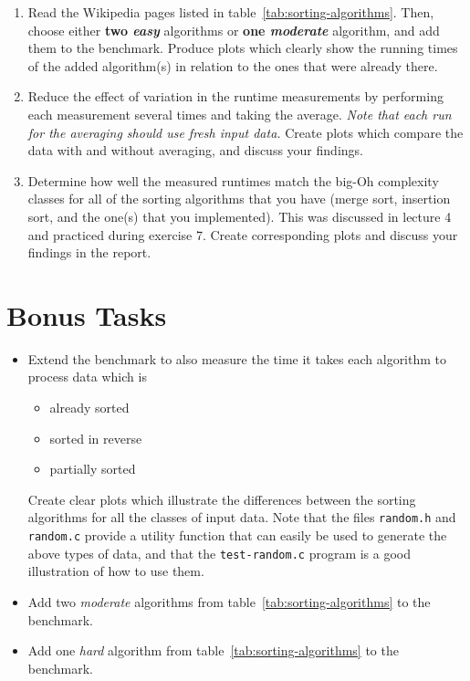 \documentclass[a4paper,10pt]{article}
\begin{document}
\begin{enumerate}

\item
  Read the Wikipedia pages listed in table~\ref{tab:sorting-algorithms}.
  Then, choose either \textbf{two \emph{easy}} algorithms or \textbf{one \emph{moderate}} algorithm, and add them to the benchmark.
  Produce plots which clearly show the running times of the added algorithm(s) in relation to the ones that were already there.

\item
  Reduce the effect of variation in the runtime measurements by performing each measurement several times and taking the average.
  \emph{Note that each run for the averaging should use fresh input data.}
  Create plots which compare the data with and without averaging, and discuss your findings.
  
\item
  Determine how well the measured runtimes match the big-Oh complexity classes for all of the sorting algorithms that you have (merge sort, insertion sort, and the one(s) that you implemented).
  This was discussed in lecture 4 and practiced during exercise 7.
  Create corresponding plots and discuss your findings in the report.
  
\end{enumerate}



\section{Bonus Tasks}

\begin{itemize}

\item
  Extend the benchmark to also measure the time it takes each algorithm to process data which is
  \begin{itemize}
  \item
    already sorted
  \item
    sorted in reverse
  \item
    partially sorted
  \end{itemize}
  Create clear plots which illustrate the differences between the sorting algorithms for all the classes of input data.
  Note that the files \texttt{random.h} and \texttt{random.c} provide a utility function that can easily be used to generate the above types of data, and that the \texttt{test-random.c} program is a good illustration of how to use them.
  
\item
  Add two \emph{moderate} algorithms from table~\ref{tab:sorting-algorithms} to the benchmark.

\item
  Add one \emph{hard} algorithm from table~\ref{tab:sorting-algorithms} to the benchmark.
  
\end{itemize}
\end{document}
